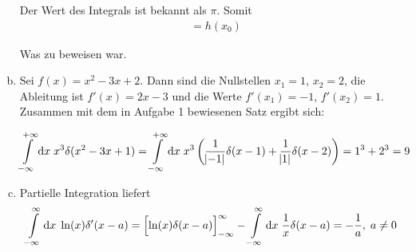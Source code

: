 \documentclass[a4paper,german,12pt,smallheadings]{scrartcl}
\begin{document}
\begin{enumerate}[a)]
    Der Wert des Integrals ist bekannt als $\pi$. Somit
    \begin{align}
      &= h(x_0)
    \end{align}

    Was zu beweisen war.

  \item
    Sei $f(x) = x^2 - 3x + 2$. Dann sind die Nullstellen $x_1 = 1$, $x_2 = 2$,
    die Ableitung ist $f'(x) = 2x - 3$ und die Werte $f'(x_1) = -1$, $f'(x_2) =
    1$. Zusammen mit dem in Aufgabe 1 bewiesenen Satz ergibt sich:

    \begin{equation}
      \int\limits_{-\infty}^{+\infty} \dif x \; x^3 \delta(x^2 - 3x + 1)
      =
      \int\limits_{-\infty}^{+\infty} \dif x \; x^3 \del{
        \frac{1}{\envert{-1}} \delta(x - 1) +
        \frac{1}{\envert{1}} \delta(x - 2)
      }
      = 1^3 + 2^3 = 9
    \end{equation}

  \item
    Partielle Integration liefert
    \begin{equation}
      \int\limits_{-\infty}^{\infty} \dif x \; \ln(x) \delta'(x-a) = \sbr[2]{\ln(x) \delta(x-a)}_{-\infty}^{\infty} - \int\limits_{-\infty}^{\infty} \dif x \; \frac{1}{x} \delta(x-a) = -\frac{1}{a}, \; a \neq 0
    \end{equation}
\end{enumerate}
\end{document}
